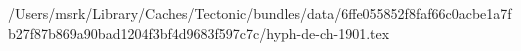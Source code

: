 /Users/msrk/Library/Caches/Tectonic/bundles/data/6ffe055852f8faf66c0acbe1a7fb27f87b869a90bad1204f3bf4d9683f597c7c/hyph-de-ch-1901.tex